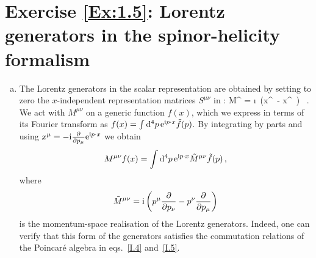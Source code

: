 

\section*{Exercise \ref{Ex:1.5}: Lorentz generators in the spinor-helicity formalism}
\label{Sol:1.5}

\begin{enumerate}[a)]

\item The Lorentz generators in the scalar representation are obtained by setting to zero the $x$-independent representation matrices $S^{\mu\nu}$ in :
\be
M^{\mu\nu} = \i\,  \left (x^{\mu}\, - 
x^{\nu}\, \right ) \, .
\ee
We act with $M^{\mu\nu}$ on a generic function $f(x)$, which we express in terms of its Fourier transform as 
$f(x) = \int \mathrm{d}^4 p \, \mathrm{e}^{\mathrm{i} p\cdot x} \tilde{f}(p)$. By integrating by parts and using $x^{\mu} = - \mathrm{i} \frac{\partial}{\partial p_{\mu}} \mathrm{e}^{\mathrm{i} p\cdot x}$ we obtain
\begin{align}
M^{\mu \nu} f(x) = \int \mathrm{d}^4 p \, \mathrm{e}^{\mathrm{i} p\cdot x} \tilde{M}^{\mu \nu} \tilde{f}(p) \,,
\end{align}
where
\begin{align}
\tilde{M}^{\mu \nu} = \mathrm{i} \left( p^{\mu} \frac{\partial}{\partial p_{\nu}} - p^{\nu} \frac{\partial}{\partial p_{\mu}} \right)
\end{align}
is the momentum-space realisation of the Lorentz generators. Indeed, one can verify that this form of the generators satisfies the commutation relations of the Poincar\'e algebra in eqs.~\eqref{I.4} and~\eqref{I.5}.


\end{enumerate}
